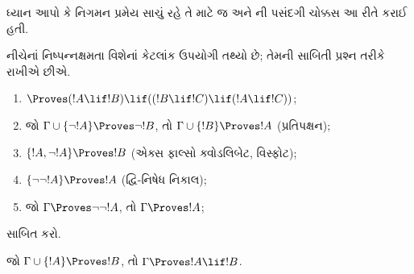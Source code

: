 ધ્યાન આપો કે નિગમન પ્રમેય સાચું રહે તે માટે જ
 અને ની પસંદગી ચોક્કસ આ રીતે
કરાઈ હતી.

નીચેનાં નિષ્પન્નક્ષમતા વિશેનાં કેટલાંક ઉપયોગી તથ્યો છે; તેમની
સાબિતી પ્રશ્ન તરીકે રાખીએ છીએ.

\begin{prop}
\begin{enumerate}
\item $\Proves (!A \lif !B) \lif ((!B \lif !C)
  \lif (!A \lif !C))$; 
\item જો $\Gamma \cup \{ \lnot !A\}
  \Proves \lnot !B$, તો $\Gamma \cup \{ !B\} \Proves
  !A$ (પ્રતિપક્ષન); 
\item  $\{ !A, \lnot!A\} \Proves
    !B$ (એક્સ ફાલ્સો ક્વોડલિબેટ, વિસ્ફોટ); 
\item  $\{ \lnot\lnot!A\} \Proves
  !A$ (દ્વિ-નિષેધ નિકાલ);
\item જો $\Gamma \Proves \lnot\lnot!A$, તો $\Gamma \Proves
  !A$;
\end{enumerate}
\end{prop}



\begin{prob}
   સાબિત કરો.
\end{prob}
\endgroup


%
  \begingroup
\makeatletter{}\makeatother


\label{guunit:OLP-0120}


\begin{thm}[નિગમન પ્રમેય]
 જો $\Gamma \cup \{!A\} \Proves !B$,
તો $\Gamma \Proves !A \lif !B$.
\end{thm}

